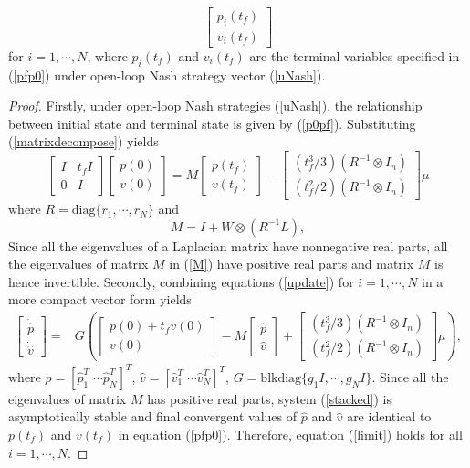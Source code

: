 \documentclass[12pt,draftcls,onecolumn]{IEEEtran}  %
\begin{document}
{\begin{thm}
\begin{equation}
\begin{bmatrix}
p_i(t_f)\\
v_i(t_f)
\end{bmatrix}
\label{limit}
\end{equation}
for $i=1,\cdots,N$, where $p_i(t_f)$ and $v_i(t_f)$ are the terminal variables specified in (\ref{pfp0}) under open-loop Nash strategy vector (\ref{uNash}).
\end{thm}
\begin{proof}
Firstly, under open-loop Nash strategies (\ref{uNash}), the relationship between initial state and terminal state is given by (\ref{p0pf}). Substituting (\ref{matrixdecompose}) yields
\begin{equation}
\begin{bmatrix}
I&t_fI\\
0&I
\end{bmatrix}\begin{bmatrix}
p(0)\\
v(0)
\end{bmatrix}=M\begin{bmatrix}
p(t_f)\\
v(t_f)
\end{bmatrix}-\begin{bmatrix}
(t_f^3/3)(R^{-1}\otimes I_n)\\
(t_f^2/2)(R^{-1}\otimes I_n)
\end{bmatrix}\mu\label{sf}
\end{equation}
where $R=\mbox{diag}\{r_1,\cdots,r_N\}$ and
\begin{equation}
M=I+W\otimes (R^{-1}L),\label{M}
\end{equation}
Since all the eigenvalues of a Laplacian matrix have nonnegative real parts, all the eigenvalues of matrix $M$ in (\ref{M}) have positive real parts and matrix $M$ is hence invertible. Secondly, combining equations (\ref{update}) for $i=1,\cdots,N$ in a more compact vector form yields
\begin{align}
\begin{bmatrix}
\dot{\hat{p}}\\
\dot{\hat{v}}
\end{bmatrix}=&G\left(\begin{bmatrix}
p(0)+t_fv(0)\\
v(0)
\end{bmatrix}-M\begin{bmatrix}
\hat{p}\\
\hat{v}
\end{bmatrix}+\begin{bmatrix}
(t_f^3/3)(R^{-1}\otimes I_n)\\
(t_f^2/2)(R^{-1}\otimes I_n)
\end{bmatrix}\mu\right),\label{stacked}
\end{align}
where $\hat{p}=[\hat{p}_1^T\;\cdots \hat{p}_N^T]^T$, $\hat{v}=[\hat{v}_1^T\;\cdots \hat{v}_N^T]^T$, {$G=\mbox{blkdiag}\{g_1I,\cdots,g_NI\}$}. Since all the eigenvalues of matrix $M$ has positive real parts, system (\ref{stacked}) is asymptotically stable and final convergent values of $\hat{p}$ and $\hat{v}$ are identical to $p(t_f)$ and $v(t_f)$ in equation (\ref{pfp0}). Therefore, equation (\ref{limit}) holds for all $i=1,\cdots,N$.
\end{proof}

}
\end{document}
